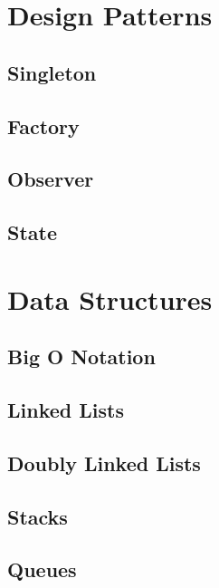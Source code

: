 \documentclass[10pt,a4paper,titlepage]{book}
\begin{document}
\chapter{Design Patterns}

\vfill
\pagebreak
\section{Singleton}

\vfill
\pagebreak
\section{Factory}

\vfill
\pagebreak
\section{Observer}

\vfill
\pagebreak
\section{State}

\vfill
\pagebreak
\chapter{Data Structures}

\vfill
\pagebreak
\section{Big O Notation}

\vfill
\pagebreak
\section{Linked Lists}

\vfill
\pagebreak
\section{Doubly Linked Lists}

\vfill
\pagebreak
\section{Stacks}

\vfill
\pagebreak
\section{Queues}

\vfill
\pagebreak
\end{document}
